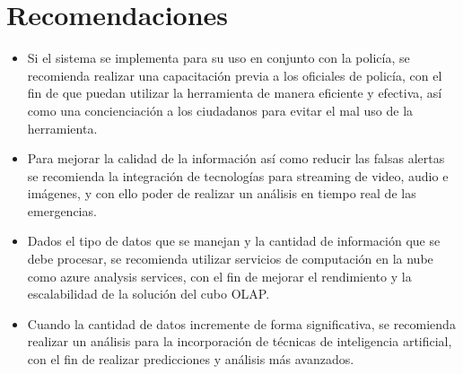 \section{Recomendaciones}

\begin{itemize}
      \item Si el sistema se implementa para su uso en conjunto con la policía, se recomienda realizar una capacitación
            previa a los oficiales de policía, con el fin de que puedan utilizar la herramienta de manera eficiente y
            efectiva, así como una concienciación a los ciudadanos para evitar el mal uso de la herramienta.

      \item Para mejorar la calidad de la información así como reducir las falsas alertas se recomienda la integración
            de tecnologías para streaming de video, audio e imágenes, y con ello poder  de realizar un análisis en
            tiempo real de las emergencias.

      \item Dados el tipo de datos que se manejan y la cantidad de información que se debe procesar, se recomienda
            utilizar servicios de computación en la nube como azure analysis services, con el fin de mejorar el
            rendimiento y la escalabilidad de la solución del cubo OLAP.

      \item Cuando la cantidad de datos incremente de forma significativa, se recomienda realizar un análisis para la
            incorporación de técnicas de inteligencia artificial, con el fin de realizar predicciones y análisis más
            avanzados.
\end{itemize}